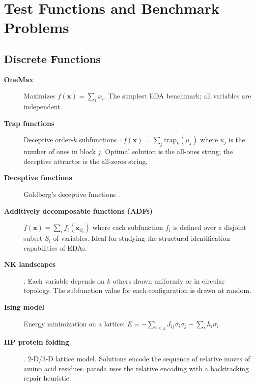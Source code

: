 \documentclass[a4paper,11pt]{article}
\begin{document}
\section{Test Functions and Benchmark Problems}
\label{sec:functions}

\subsection{Discrete Functions}

\begin{description}
  \item[\textbf{OneMax}] Maximizes $f(\mathbf{x}) = \sum_i x_i$.
    The simplest EDA benchmark; all variables are independent.

  \item[\textbf{Trap functions}] Deceptive order-$k$ subfunctions
    \citep{Ackley:1987}:
    $f(\mathbf{x}) = \sum_{j} \text{trap}_k(u_j)$ where $u_j$ is the
    number of ones in block $j$.  Optimal solution is the all-ones string;
    the deceptive attractor is the all-zeros string.

  \item[\textbf{Deceptive functions}] Goldberg's deceptive functions
    \citep{Goldberg:1987}.

  \item[\textbf{Additively decomposable functions (ADFs)}]
    $f(\mathbf{x}) = \sum_i f_i(\mathbf{x}_{S_i})$ where each subfunction
    $f_i$ is defined over a disjoint subset $S_i$ of variables.  Ideal for
    studying the structural identification capabilities of EDAs.

  \item[\textbf{NK landscapes}] \citep{Kauffman:1993}.
    Each variable depends on $k$ others drawn uniformly or in circular topology.
    The subfunction value for each configuration is drawn at random.

  \item[\textbf{Ising model}]
    Energy minimization on a lattice:
    $E = -\sum_{i<j} J_{ij}\sigma_i\sigma_j - \sum_i h_i\sigma_i$.

  \item[\textbf{HP protein folding}] \citep{Dill:1985}.
    2-D/3-D lattice model.  Solutions encode the sequence of relative moves of
    amino acid residues.  pateda uses the relative encoding with a backtracking
    repair heuristic.


\end{description}
\end{document}
